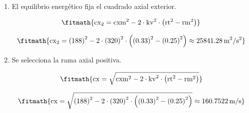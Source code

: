 \begin{enumerate}

\item El equilibrio energético fija el cuadrado axial exterior.

\[\fitmath{\mathrm{cx}_{2}={\mathrm{cxm}}^{2}-2\cdot {\mathrm{kv}}^{2}\cdot \left({\mathrm{rt}}^{2}-{\mathrm{rm}}^{2}\right)}\]

\[\fitmath{\mathrm{cx}_{2}={(188)}^{2}-2\cdot {(320)}^{2}\cdot \left({(0.33)}^{2}-{(0.25)}^{2}\right)\approx 25841.28\,\mathrm{m^{2}/s^{2}}}\]

\item Se selecciona la rama axial positiva.

\[\fitmath{\mathrm{cx}=\sqrt{{\mathrm{cxm}}^{2}-2\cdot {\mathrm{kv}}^{2}\cdot \left({\mathrm{rt}}^{2}-{\mathrm{rm}}^{2}\right)}}\]

\[\fitmath{\mathrm{cx}=\sqrt{{(188)}^{2}-2\cdot {(320)}^{2}\cdot \left({(0.33)}^{2}-{(0.25)}^{2}\right)}\approx 160.7522\,\mathrm{m/s}}\]

\end{enumerate}
